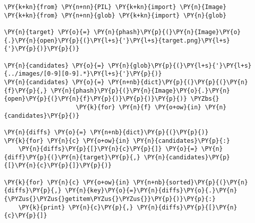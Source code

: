 \begin{Verbatim}[commandchars=\\\{\}]
\PY{k+kn}{from} \PY{n+nn}{PIL} \PY{k+kn}{import} \PY{n}{Image}
\PY{k+kn}{from} \PY{n+nn}{glob} \PY{k+kn}{import} \PY{n}{glob}

\PY{n}{target} \PY{o}{=} \PY{n}{phash}\PY{p}{(}\PY{n}{Image}\PY{o}{.}\PY{n}{open}\PY{p}{(}\PY{l+s}{'}\PY{l+s}{target.png}\PY{l+s}{'}\PY{p}{)}\PY{p}{)}

\PY{n}{candidates} \PY{o}{=} \PY{n}{glob}\PY{p}{(}\PY{l+s}{'}\PY{l+s}{../images/[0-9][0-9].*}\PY{l+s}{'}\PY{p}{)}
\PY{n}{candidates} \PY{o}{=} \PY{n+nb}{dict}\PY{p}{(}\PY{p}{(}\PY{n}{f}\PY{p}{,} \PY{n}{phash}\PY{p}{(}\PY{n}{Image}\PY{o}{.}\PY{n}{open}\PY{p}{(}\PY{n}{f}\PY{p}{)}\PY{p}{)}\PY{p}{)} \PYZbs{}
                    \PY{k}{for} \PY{n}{f} \PY{o+ow}{in} \PY{n}{candidates}\PY{p}{)}

\PY{n}{diffs} \PY{o}{=} \PY{n+nb}{dict}\PY{p}{(}\PY{p}{)}
\PY{k}{for} \PY{n}{c} \PY{o+ow}{in} \PY{n}{candidates}\PY{p}{:}
    \PY{n}{diffs}\PY{p}{[}\PY{n}{c}\PY{p}{]} \PY{o}{=} \PY{n}{diff}\PY{p}{(}\PY{n}{target}\PY{p}{,} \PY{n}{candidates}\PY{p}{[}\PY{n}{c}\PY{p}{]}\PY{p}{)}

\PY{k}{for} \PY{n}{c} \PY{o+ow}{in} \PY{n+nb}{sorted}\PY{p}{(}\PY{n}{diffs}\PY{p}{,} \PY{n}{key}\PY{o}{=}\PY{n}{diffs}\PY{o}{.}\PY{n}{\PYZus{}\PYZus{}getitem\PYZus{}\PYZus{}}\PY{p}{)}\PY{p}{:}
    \PY{k}{print} \PY{n}{c}\PY{p}{,} \PY{n}{diffs}\PY{p}{[}\PY{n}{c}\PY{p}{]}
\end{Verbatim}
